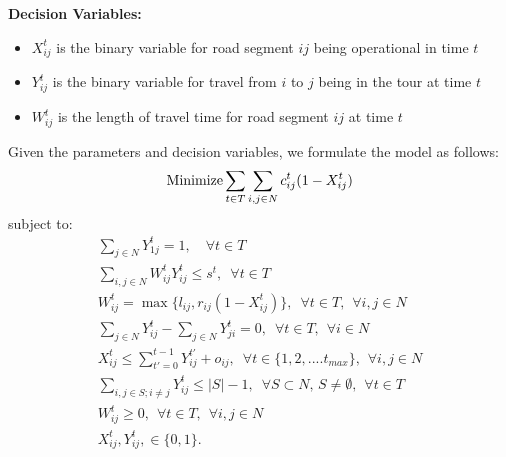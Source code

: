 \textbf{Decision Variables:}
\begin{itemize}
\item $X_{ij}^t$ is the binary variable for road segment $ij$ being operational in time $t$
\item $Y_{ij}^t$ is the binary variable for travel from $i$ to $j$ being in the tour at time $t$
\item $W_{ij}^t$ is the length of travel time for road segment $ij$ at time $t$
\end{itemize}

Given the parameters and decision variables, we formulate the model as follows:
\begin{equation}
\textnormal{Minimize} \sum_{t \in T}  \sum_{i,j \in N} c_{ij}^t(1-X_{ij}^t) 
\end{equation}
subject to:
\begin{eqnarray}
\sum_{j \in N} Y_{1j}^t = 1,\hspace{6pt} \hspace{6pt} \forall t\in T \\
\sum_{i,j \in N} W_{ij}^t Y_{ij}^t \leq s^t, \hspace{6pt} \forall t\in T \\
W_{ij}^t = \max \{l_{ij}, r_{ij}(1-X_{ij}^t) \}, \hspace{6pt} \forall t\in T, \hspace{5pt} \forall i,j \in N\\
\sum_{j \in N} Y_{ij}^t - \sum_{j \in N} Y_{ji}^t = 0, \hspace{6pt} \forall t\in T, \hspace{5pt} \forall i \in N\\
X_{ij}^t \le \sum_{t'=0}^{t-1} Y_{ij}^{t'} + o_{ij} , \hspace{6pt} \forall t\in \{1,2,....t_{max}\},  \hspace{5pt} \forall i,j \in N\\
\sum_{i,j \in S; i\neq j} Y_{ij}^t \leq |S|-1, \hspace{6pt} \forall S \subset N, \hspace{2pt} S \neq \emptyset, \hspace{5pt} \forall t\in T\\
W_{ij}^t \geq 0, \hspace{5pt} \forall t\in T, \hspace{5pt} \forall i,j \in N \\
X_{ij}^t,Y_{ij}^t, \in \{0,1\}. 
\end{eqnarray}

